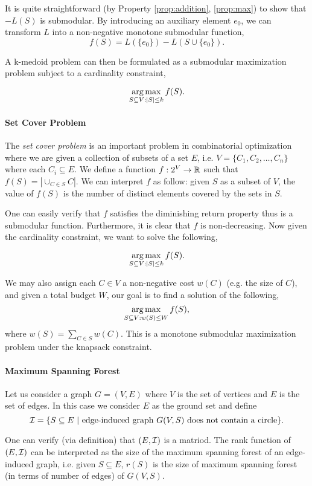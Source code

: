 It is quite straightforward (by Property \ref{prop:addition}, \ref{prop:max}) to show that $-L(S)$ is submodular. By introducing an auxiliary element $e_0$, we can transform $L$ into a non-negative monotone submodular function,
$$f(S) = L(\{e_0\}) - L(S \cup \{e_0\}).$$ 

A k-medoid problem can then be formulated as a submodular maximization problem subject to a cardinality constraint,

$$\operatorname*{arg\,max}_{S\subseteq V: |S| \leq k} f(S).$$


\paragraph{Set Cover Problem}
The \emph{set cover problem} is an important problem in combinatorial optimization where we are given a collection of subsets of a set $E$, i.e. $V = \{C_1, C_2, \ldots, C_n\}$ where each $C_i \subseteq E$. We define a function $f:2^V \rightarrow \mathbb{R}$ such that $f(S) = |\cup_{C\in S} C|$. We can interpret $f$ as follow: given $S$ as a subset of $V$, the value of $f(S)$ is the number of distinct elements covered by the sets in $S$.

One can easily verify that $f$ satisfies the diminishing return property thus is a submodular function. Furthermore, it is clear that $f$ is non-decreasing.  Now given the cardinality constraint, we want to solve the following,

$$\operatorname*{arg\,max}_{S\subseteq V: |S|\leq k} f(S).$$

We may also assign each $C\in V$ a non-negative cost $w(C)$ (e.g. the size of $C$), and given a total budget $W$, our goal is to find a solution of the following,
$$\operatorname*{arg\,max}_{S\subseteq V: w(S) \leq W} f(S),$$
where $w(S) = \sum_{C\in S} w(C)$. This is a monotone submodular maximization problem under the knapsack constraint.



\paragraph{Maximum Spanning Forest}
Let us consider a graph $G = (V, E)$ where $V$ is the set of vertices and $E$ is the set of edges. In this case we consider $E$ as the ground set and define 
$$\mathcal{I} = \{S\subseteq E ~|~\text{edge-induced graph}~G(V, S)~\text{does not contain a circle}\}.$$

One can verify (via definition) that $(E, \mathcal{I})$ is a matriod. The rank function of $(E, \mathcal{I})$ can be interpreted as the size of the maximum spanning forest of an edge-induced graph, i.e. given $S\subseteq E$, $r(S)$ is the size of maximum spanning forest (in terms of number of edges) of $G(V, S)$. 




